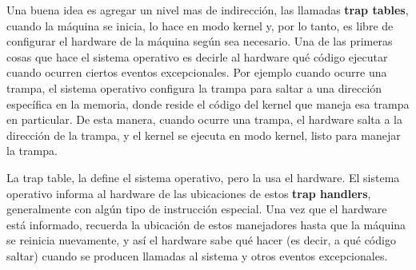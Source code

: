 \documentclass{article}
\begin{document}
Una buena idea es agregar un nivel mas de indirección, las llamadas \textbf{trap tables}, cuando la máquina se inicia, lo hace en modo kernel y, por lo tanto, es libre de configurar el hardware de la máquina según sea necesario. Una de las primeras cosas que hace el sistema operativo es decirle al hardware qué código ejecutar cuando ocurren ciertos eventos excepcionales. Por ejemplo cuando ocurre una trampa, el sistema operativo configura la trampa para saltar a una dirección específica en la memoria, donde reside el código del kernel que maneja esa trampa en particular. De esta manera, cuando ocurre una trampa, el hardware salta a la dirección de la trampa, y el kernel se ejecuta en modo kernel, listo para manejar la trampa.

La trap table, la define el sistema operativo, pero la usa el hardware. El sistema operativo informa al hardware de las ubicaciones de estos \textbf{trap handlers}, generalmente con algún tipo de instrucción especial. Una vez que el hardware está informado, recuerda la ubicación de estos manejadores hasta que la máquina se reinicia nuevamente, y así el hardware sabe qué hacer (es decir, a qué código saltar) cuando se producen llamadas al sistema y otros eventos excepcionales.
\end{document}
